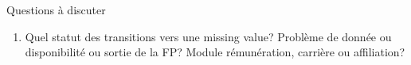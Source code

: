 \documentclass[11pt,a4paper]{article}
\begin{document}
Questions à discuter
\begin{enumerate}[leftmargin=1cm ,parsep=0cm,itemsep=0cm,topsep=0cm] 
\item Quel statut des transitions vers une missing value? Problème de donnée ou disponibilité ou sortie de la FP? Module rémunération, carrière ou affiliation? 
\end{enumerate}




\ifx\isEmbedded\undefined
\newpage
 

\end{document}
